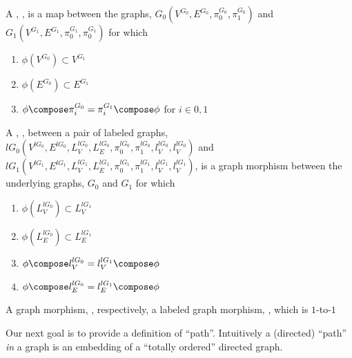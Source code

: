 \documentclass[a4paper,openany]{amsart}
\begin{document}
\begin{definition}
A , , is a map between the graphs,
$G_0(V^{G_0}, E^{G_0}, \pi^{G_0}_0, \pi^{G_0}_1)$ and $G_1(V^{G_1}, E^{G_1}, \pi^{G_1}_0,
\pi^{G_1}_0)$ for which

\begin{enumerate}

\item $\phi(V^{G_0}) \subset V^{G_1}$

\item $\phi(E^{G_0}) \subset E^{G_1}$

\item $\phi \compose \pi^{G_0}_i = \pi^{G_1}_i \compose \phi$ for $i \in {0, 1}$

\end{enumerate}

A , , between a pair of labeled
graphs, $lG_0(V^{lG_0}, E^{lG_0}, L^{lG_0}_V, L^{lG_0}_E, \pi^{lG_0}_0, \pi^{lG_0}_1,
l^{lG_0}_V, l^{lG_0}_V)$ and $lG_1(V^{lG_1}, E^{lG_1}, L^{lG_1}_V, L^{lG_1}_E,
\pi^{lG_1}_0, \pi^{lG_1}_1, l^{lG_1}_V, l^{lG_1}_V)$, is a graph morphism between the
underlying graphs, $G_0$ and $G_1$ for which

\begin{enumerate}

\item $\phi(L^{lG_0}_V) \subset L^{lG_1}_V$

\item $\phi(L^{lG_0}_E) \subset L^{lG_1}_E$

\item $\phi \compose l^{lG_0}_V = l^{lG_1}_V \compose \phi$

\item $\phi \compose l^{lG_0}_E = l^{lG_1}_E \compose \phi$

\end{enumerate}

\end{definition}

\begin{definition}

A graph morphism, , respectively, a labeled graph morphism, 
, which is $1$-to-$1$

\end{definition}

Our next goal is to provide a definition of ``path''. Intuitively a (directed) ``path''
\emph{in} a graph is an embedding of a ``totally ordered'' directed graph.
\end{document}
